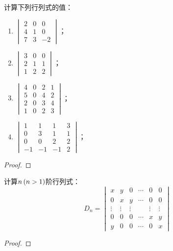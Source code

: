 \begin{problem}
计算下列行列式的值：
\begin{enumerate}
    \item \(\begin{vmatrix}2&0&0\\4&1&0\\7&3&-2\end{vmatrix}\)；
    \item \(\begin{vmatrix}3&0&0\\2&1&1\\1&2&2\end{vmatrix}\)；
    \item \(\begin{vmatrix}4&0&2&1\\5&0&4&2\\2&0&3&4\\1&0&2&3\end{vmatrix}\)；
    \item \(\begin{vmatrix}1&1&1&3\\0&3&1&1\\0&0&2&2\\-1&-1&-1&2\end{vmatrix}\)；
\end{enumerate}
\end{problem}
\begin{proof}

\end{proof}

\setcounter{problem}{6}
\begin{problem}
计算\(n\left( n>1 \right)\)阶行列式：
\begin{equation*}
    D_n=
    \begin{vmatrix}
        x      & y      & 0      & \cdots & 0      & 0      \\
        0      & x      & y      & \cdots & 0      & 0      \\
        \vdots & \vdots & \vdots &        & \vdots & \vdots \\
        0      & 0      & 0      & \cdots & x      & y      \\
        y      & 0      & 0      & \cdots & 0      & x
    \end{vmatrix}
\end{equation*}
\end{problem}
\begin{proof}

\end{proof}

